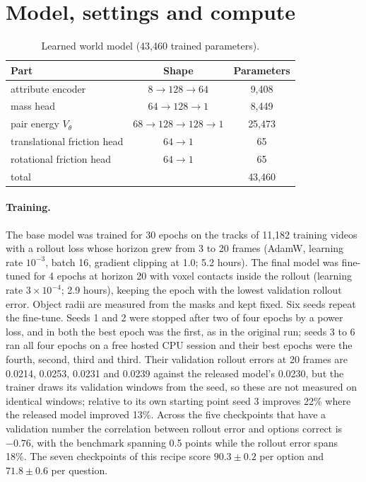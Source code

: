 \section{Model, settings and compute}
\label{app:settings}

\begin{table}[h]
\caption{Learned world model (43,460 trained parameters).}
\label{tab:params}
\centering
\small
\begin{tabular}{@{}lcc@{}}
\toprule
Part & Shape & Parameters \\
\midrule
attribute encoder & $8 \to 128 \to 64$ & 9,408 \\
mass head & $64 \to 128 \to 1$ & 8,449 \\
pair energy $V_\theta$ & $68 \to 128 \to 128 \to 1$ & 25,473 \\
translational friction head & $64 \to 1$ & 65 \\
rotational friction head & $64 \to 1$ & 65 \\
\midrule
total & & 43,460 \\
\bottomrule
\end{tabular}
\end{table}

\paragraph{Training.}
The base model was trained for 30 epochs on the tracks of 11,182 training videos with a rollout loss whose horizon grew from 3 to 20 frames (AdamW, learning rate $10^{-3}$, batch 16, gradient clipping at 1.0; 5.2 hours).
The final model was fine-tuned for 4 epochs at horizon 20 with voxel contacts inside the rollout (learning rate $3 \times 10^{-4}$; 2.9 hours), keeping the epoch with the lowest validation rollout error.
Object radii are measured from the masks and kept fixed.
Six seeds repeat the fine-tune. Seeds 1 and 2 were stopped after two of four epochs by a power loss, and in both the best epoch was the first, as in the original run; seeds 3 to 6 ran all four epochs on a free hosted CPU session and their best epochs were the fourth, second, third and third.
Their validation rollout errors at 20 frames are 0.0214, 0.0253, 0.0231 and 0.0239 against the released model's 0.0230, but the trainer draws its validation windows from the seed, so these are not measured on identical windows; relative to its own starting point seed 3 improves 22\% where the released model improved 13\%.
Across the five checkpoints that have a validation number the correlation between rollout error and options correct is $-0.76$, with the benchmark spanning 0.5 points while the rollout error spans 18\%.
The seven checkpoints of this recipe score $90.3 \pm 0.2$ per option and $71.8 \pm 0.6$ per question.

